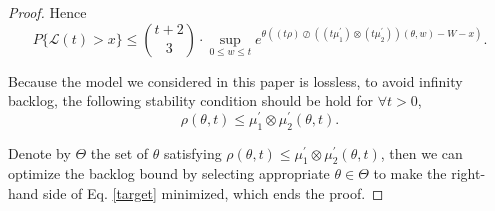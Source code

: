 \documentclass[paper]{ieice}
\newtheorem{proof}{Proof}
\begin{document}
\begin{proof}
Hence
\begin{equation}\label{target}
P\{\mathcal{L}(t)>x\}\leq {t+2\choose 3}\cdot \sup_{0\leq w\leq t}e^{\theta((t\rho)\oslash((t\mu_1^\prime)\otimes(t\mu_2^\prime))(\theta,w)-W-x)}.
\end{equation}

Because the model we considered in this paper is lossless, to avoid infinity backlog, the following stability condition should be hold for $\forall t>0$,
$$\rho(\theta,t)\leq \mu_1^\prime\otimes\mu_2^\prime(\theta,t).$$

Denote by $\Theta$ the set of $\theta$ satisfying $\rho(\theta,t)\leq \mu_1^\prime\otimes\mu_2^\prime(\theta,t)$, then we can optimize the backlog bound by selecting appropriate $\theta\in\Theta$ to make the right-hand side of Eq. \ref{target} minimized, which ends the proof.\QED
\end{proof}
\end{document}
